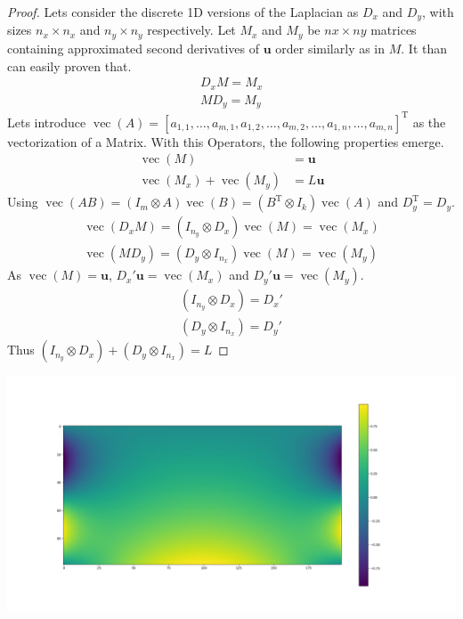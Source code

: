 \documentclass{article}
\begin{document}
\begin{proof}
Lets consider the discrete 1D versions of the Laplacian as $D_x$ and $D_y$, with sizes $n_x \times n_x$ and $n_y \times n_y$ respectively.
Let $M_x$ and $M_y$ be $nx\times ny$ matrices containing approximated second derivatives of $\mathbf{u}$ order similarly as in $M$. It than can easily proven that.
\begin{align}
    D_x M = M_x \\
    M D_y = M_y
\end{align}
Lets introduce $\operatorname{vec}(A)=\left[a_{1,1}, \ldots, a_{m, 1}, a_{1,2}, \ldots, a_{m, 2}, \ldots, a_{1, n}, \ldots, a_{m, n}\right]^{\mathrm{T}}$ as the vectorization of a Matrix. With this Operators, the following properties emerge.
\begin{align}
    \operatorname{vec}(M) &= \mathbf{u} \\
    \operatorname{vec}(M_x) + \operatorname{vec}(M_y) &= L\mathbf{u}
\end{align}
Using $\operatorname{vec}(A B)=\left(I_{m} \otimes A\right) \operatorname{vec}(B)=\left(B^{\mathrm{T}} \otimes I_{k}\right) \operatorname{vec}(A)$ and $D_y^{\mathrm{T}} = D_y$.
\begin{align}
    \operatorname{vec}(D_x M) = (I_{n_y} \otimes D_x)\operatorname{vec}(M) = \operatorname{vec}(M_x)\\
    \operatorname{vec}(M D_y) = (D_y \otimes I_{n_x})\operatorname{vec}(M) = \operatorname{vec}(M_y)
\end{align} 
As $\operatorname{vec}(M) = \mathbf{u}$, $D_x' \mathbf{u} = \operatorname{vec}(M_x)$ and $D_y' \mathbf{u} = \operatorname{vec}(M_y)$.
\begin{align}
    (I_{n_y} \otimes D_x) = D_x' \\
    (D_y \otimes I_{n_x}) = D_y'
\end{align}
Thus $(I_{n_y} \otimes D_x) + (D_y \otimes I_{n_x}) = L$
\end{proof}

\includegraphics[width=\linewidth]{Figure_1.png}

\end{document}
